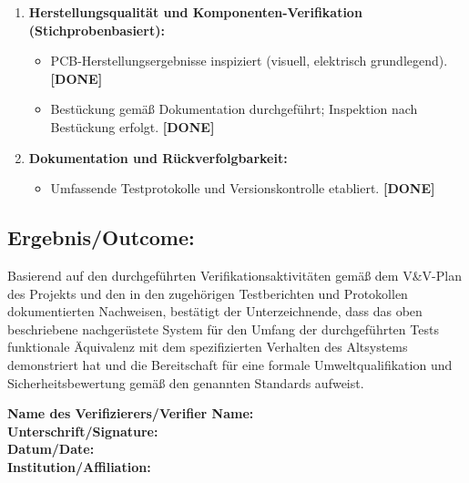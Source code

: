 \begin{enumerate}
\begin{itemize}
		      \item Designdateien, Firmware, Testartefakte und Dokumentation unter Versionskontrolle. \textbf{[DONE]}
	      \end{itemize}
	\item \textbf{Herstellungsqualität und Komponenten-Verifikation (Stichprobenbasiert):}
	      \begin{itemize}
		      \item PCB-Herstellungsergebnisse inspiziert (visuell, elektrisch grundlegend). \textbf{[DONE]}
		      \item Bestückung gemäß Dokumentation durchgeführt; Inspektion nach Bestückung erfolgt. \textbf{[DONE]}
	      \end{itemize}
	\item \textbf{Dokumentation und Rückverfolgbarkeit:}
	      \begin{itemize}
		      \item Umfassende Testprotokolle und Versionskontrolle etabliert. \textbf{[DONE]}
	      \end{itemize}
\end{enumerate}

\subsection*{Ergebnis/Outcome:}

Basierend auf den durchgeführten Verifikationsaktivitäten gemäß dem V\&V-Plan des Projekts und den in den zugehörigen Testberichten und Protokollen dokumentierten Nachweisen, bestätigt der Unterzeichnende, dass das oben beschriebene nachgerüstete System für den Umfang der durchgeführten Tests funktionale Äquivalenz mit dem spezifizierten Verhalten des Altsystems demonstriert hat und die Bereitschaft für eine formale Umweltqualifikation und Sicherheitsbewertung gemäß den genannten Standards aufweist.

\bigskip\bigskip

\noindent\textbf{Name des Verifizierers/Verifier Name:} \makebox[5cm]{\hrulefill} \\
\textbf{Unterschrift/Signature:} \makebox[5cm]{\hrulefill} \\
\textbf{Datum/Date:} \makebox[5cm]{\hrulefill} \\
\textbf{Institution/Affiliation:} \makebox[5cm]{\hrulefill}

\bigskip
\hrulefill
